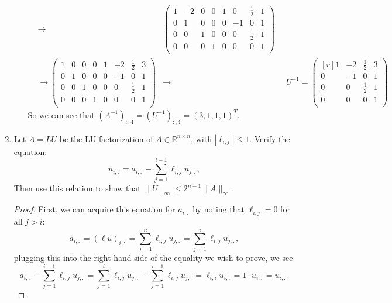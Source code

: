 \documentclass[11pt]{article}
\newcommand{\R}{\mathbb{R}}
\begin{document}
\begin{enumerate}
\begin{enumerate}
\begin{align*}
			                       & \to                                 &
			            \left(\begin{array}{rrrr|rrrr}
					                  1 & -2 & 0 & 0 & 1 & 0  & \frac12 & 1 \\
					                  0 & 1  & 0 & 0 & 0 & -1 & 0       & 1 \\
					                  0 & 0  & 1 & 0 & 0 & 0  & \frac12 & 1 \\
					                  0 & 0  & 0 & 1 & 0 & 0  & 0       & 1 \\
				                  \end{array}\right)           \\
			                       & \to
			            \left(\begin{array}{rrrr|rrrr}
					                  1 & 0 & 0 & 0 & 1 & -2 & \frac12 & 3 \\
					                  0 & 1 & 0 & 0 & 0 & -1 & 0       & 1 \\
					                  0 & 0 & 1 & 0 & 0 & 0  & \frac12 & 1 \\
					                  0 & 0 & 0 & 1 & 0 & 0  & 0       & 1 \\
				                  \end{array}\right)
			                       & \to                                 &
			            \;\;U^{-1} =
			            \begin{pmatrix*}[r]
				            1 & -2 & \frac12 & 3 \\
				            0 & -1 & 0   & 1 \\
				            0 & 0  & \frac12 & 1 \\
				            0 & 0  & 0   & 1 \\
			            \end{pmatrix*}
		            \end{align*}
		            So we can see that \((A^{-1})_{:,4} = (U^{-1})_{:,4} = (3,1,1,1)^T\).
	      \end{enumerate}

	\item Let \(A = LU\) be the LU factorization of \(A \in \R^{n \times n}\), with \(|\ell_{i,j}| \leq 1\).  Verify the equation:
	      \[u_{i,:} = a_{i,:} - \sum_{j=1}^{i-1} \ell_{i,j}u_{j,:},\]
	      Then use this relation to show that \(\lVert U \rVert_\infty \leq 2^{n-1} \lVert A \rVert_\infty\).

	      \begin{proof}
		      First, we can acquire this equation for \(a_{i,:}\) by noting that \(\ell_{i,j} = 0\) for all \(j>i\):
		      \[a_{i,:} = (\ell u)_{i,:} = \sum_{j=1}^n \ell_{i,j}u_{j,:} = \sum_{j=1}^i \ell_{i,j}u_{j,:},\]
		      plugging this into the right-hand side of the equality we wish to prove, we see
		      \[a_{i,:} - \sum_{j=1}^{i-1} \ell_{i,j}u_{j,:} = \sum_{j=1}^i \ell_{i,j}u_{j,:} - \sum_{j=1}^{i-1} \ell_{i,j}u_{j,:} = \ell_{i,i}u_{i,:} = 1 \cdot u_{i,:} = u_{i,:}.\]



\end{proof}
\end{enumerate}
\end{document}
